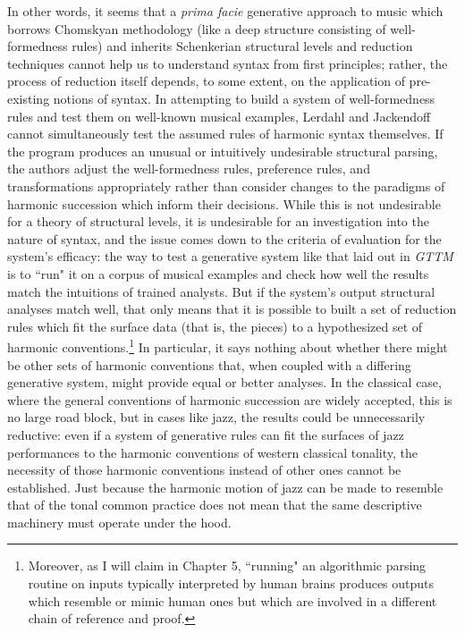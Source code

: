 In other words, it seems that a \emph{prima facie} generative approach to music which borrows Chomskyan methodology (like a deep structure consisting of well-formedness rules) and inherits Schenkerian structural levels and reduction techniques cannot help us to understand syntax from first principles; rather, the process of reduction itself depends, to some extent, on the application of pre-existing notions of syntax.  In attempting to build a system of well-formedness rules and test them on well-known musical examples, Lerdahl and Jackendoff cannot simultaneously test the assumed rules of harmonic syntax themselves.  If the program produces an unusual or intuitively undesirable structural parsing, the authors adjust the well-formedness rules, preference rules, and transformations appropriately rather than consider changes to the paradigms of harmonic succession which inform their decisions.  While this is not undesirable for a theory of structural levels, it is undesirable for an investigation into the nature of syntax, and the issue comes down to the criteria of evaluation for the system's efficacy: the way to test a generative system like that laid out in \emph{GTTM} is to ``run" it on a corpus of musical examples and check how well the results match the intuitions of trained analysts.  But if the system's output structural analyses match well, that only means that it is possible to built a set of reduction rules which fit the surface data (that is, the pieces) to a hypothesized set of harmonic conventions.\footnote{Moreover, as I will claim in Chapter 5, ``running" an algorithmic parsing routine on inputs typically interpreted by human brains produces outputs which resemble or mimic human ones but which are involved in a different chain of reference and proof.}  In particular, it says nothing about whether there might be other sets of harmonic conventions that, when coupled with a differing generative system, might provide equal or better analyses.  In the classical case, where the general conventions of harmonic succession are widely accepted, this is no large road block, but in cases like jazz, the results could be unnecessarily reductive: even if a system of generative rules can fit the surfaces of jazz performances to the harmonic conventions of western classical tonality, the necessity of those harmonic conventions instead of other ones cannot be established.  Just because the harmonic motion of jazz can be made to resemble that of the tonal common practice does not mean that the same descriptive machinery must operate under the hood.  


